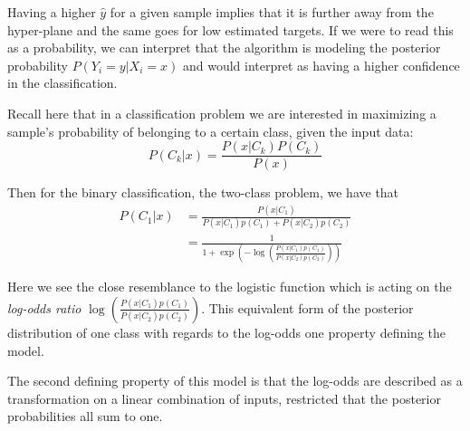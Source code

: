 Having a higher $\hat{y}$ for a given sample implies that it is further away from the hyper-plane and the same goes for low estimated targets.
If we were to read this as a probability, we can interpret that the algorithm is modeling the posterior probability $P(Y_i = y | X_i = x)$ and would interpret as having a higher confidence in the classification.






Recall here that in a classification problem we are interested in maximizing a sample's probability of belonging to a certain class, given the input data:
\begin{equation}
P(C_k| x) = \frac{P(x|C_k)P(C_k)}{P(x)}
\end{equation}

Then for the binary classification, the two-class problem, we have that
\begin{equation}
\begin{split}
P(C_1| x) & = \frac{P(x|C_1) }{P(x|C_1)p(C_1) + P(x|C_2)p(C_2)} \\
& = \frac{1 }
{1 + \exp \left(- \log \left(  \frac{ P(x|C_1)p(C_1)}
{P(x|C_2)p(C_2)
} \right) \right)
}
\end{split}
\end{equation}

Here we see the close resemblance to the logistic function which is acting on the \textit{log-odds ratio} $ \log \left(  \frac{ P(x|C_1)p(C_1)}{P(x|C_2)p(C_2) } \right)$.
This equivalent form of the posterior distribution of one class with regards to the log-odds one property defining the model.



The second defining property of this model is that the log-odds are described as a transformation on a linear combination of inputs, restricted that the posterior probabilities all sum to one.

